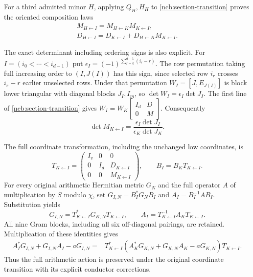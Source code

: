 \documentclass[11pt,a4paper]{article}
\begin{document}
For a third admitted minor $H$, applying $Q_H,H_H$ to
\eqref{ncb:section-transition} proves the oriented composition laws
\begin{equation}\tag{NCB19}\label{ncb:cocycle}
\begin{gathered}
M_{H\leftarrow I}=M_{H\leftarrow K}M_{K\leftarrow I},\\
D_{H\leftarrow I}
 =D_{K\leftarrow I}+D_{H\leftarrow K}M_{K\leftarrow I}.
\end{gathered}
\end{equation}

The exact determinant including ordering signs is also explicit.
For $I=(i_0<\cdots<i_{d-1})$ put
$\epsilon_I=(-1)^{\sum_{r=0}^{d-1}(i_r-r)}$.
The row permutation taking full increasing order to $(I,J(I))$
has this sign, since selected row $i_r$ crosses $i_r-r$ earlier
unselected rows. Under that permutation $W_I=[J,E_{J(I)}]$ is
block lower triangular with diagonal blocks $J_I,I_m$, so
$\det W_I=\epsilon_I\det J_I$. The first line of
\eqref{ncb:section-transition} gives
$W_I=W_K\left[\begin{smallmatrix}I_d&D\\0&M\end{smallmatrix}\right]$.
Consequently
\begin{equation}\tag{NCB20}\label{ncb:dettransition}
\det M_{K\leftarrow I}
 =\frac{\epsilon_I\det J_I}{\epsilon_K\det J_K}.
\end{equation}

The full coordinate transformation, including the unchanged low
coordinates, is
\begin{equation}\tag{NCB21}\label{ncb:full-transition}
T_{K\leftarrow I}=
\begin{pmatrix}I_v&0&0\\0&I_d&D_{K\leftarrow I}\\
0&0&M_{K\leftarrow I}\end{pmatrix},
\qquad B_I=B_KT_{K\leftarrow I}.
\end{equation}
For every original arithmetic Hermitian metric $G_N$ and the full
operator $A$ of multiplication by $S$ modulo $\chi$, set
$G_{I,N}=B_I^*G_NB_I$ and $A_I=B_I^{-1}AB_I$. Substitution yields
\begin{equation}\tag{NCB22}\label{ncb:gram-action}
G_{I,N}=T_{K\leftarrow I}^*G_{K,N}T_{K\leftarrow I},\qquad
A_I=T_{K\leftarrow I}^{-1}A_KT_{K\leftarrow I}.
\end{equation}
All nine Gram blocks, including all six off-diagonal pairings, are
retained. Multiplication of these identities gives
\begin{equation}\tag{NCB23}\label{ncb:centered-action}
\begin{split}
A_I^*G_{I,N}+G_{I,N}A_I-aG_{I,N}
={}&T_{K\leftarrow I}^*
(A_K^*G_{K,N}+G_{K,N}A_K-aG_{K,N})T_{K\leftarrow I}.
\end{split}
\end{equation}
Thus the full arithmetic action is preserved under the original
coordinate transition with its explicit conductor corrections.
\end{document}
